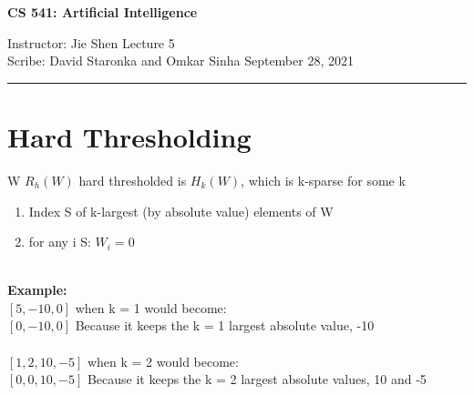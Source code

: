 \documentclass[12pt]{article}
\begin{document}


\begin{center}
\bf\large CS 541: Artificial Intelligence
\end{center}

\noindent
Instructor: Jie Shen
\hfill
Lecture 5               %
\\
Scribe:   David Staronka and Omkar Sinha              %
\hfill
September 28, 2021                         %

\noindent
\rule{\textwidth}{1pt}

\medskip


    \section{Hard Thresholding}
        W \in $R_h(W)$ hard thresholded is $H_k(W)$, which is k-sparse for some k
        \begin{enumerate}
            \item{Index S of k-largest (by absolute value) elements of W}
            \item{for any i \notin S: $W_i=0$}
        \end{enumerate}
    \\
    \textbf{Example:} \\
    $[5, -10, 0]$ when k = 1 would become: 
    \\
    $[0, -10, 0]$ Because it keeps the k = 1 largest absolute value, -10 
    \\ \\
    $[1, 2, 10, -5]$ when k = 2 would become:
    \\
    $[0, 0, 10, -5]$ Because it keeps the k = 2 largest absolute values, 10 and -5
    
\end{document}
